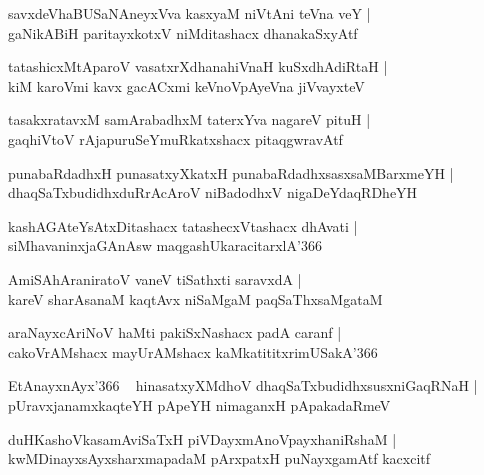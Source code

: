 \documentclass[twoside,12pt,openright]{book}
\newcounter{shloka}[chapter]
\begin{document}
\begin{shloka}%
savxdeVhaBUSaNAneyxVva kasxyaM niVtAni teVna veY |\\
gaNikABiH paritayxkotxV niMditashacx dhanakaSxyAtf
\end{shloka}

\begin{shloka}%
tatashicxMtAparoV vasatxrXdhanahiVnaH kuSxdhAdiRtaH |\\
kiM karoVmi kavx gacACxmi keVnoVpAyeVna jiVvayxteV
\end{shloka}

\begin{shloka}%
tasakxratavxM samArabadhxM taterxYva nagareV pituH |\\
gaqhiVtoV rAjapuruSeYmuRkatxshacx pitaqgwravAtf
\end{shloka}

\begin{shloka}%
punabaRdadhxH punasatxyXkatxH punabaRdadhxsasxsaMBarxmeYH |\\
dhaqSaTxbudidhxduRrAcAroV niBadodhxV nigaDeYdaqRDheYH
\end{shloka}

\begin{shloka}%
kashAGAteYsAtxDitashacx tatashecxVtashacx dhAvati |\\
siMhavaninxjaGAnAsw maqgashUkaracitarxlA\char'366
\end{shloka}

\begin{shloka}%
AmiSAhAraniratoV vaneV tiSathxti saravxdA |\\
kareV sharAsanaM kaqtAvx niSaMgaM paqSaThxsaMgataM 
\end{shloka}

\begin{shloka}%
araNayxcAriNoV haMti pakiSxNashacx padA caranf |\\
cakoVrAMshacx mayUrAMshacx kaMkatititxrimUSakA\char'366
\end{shloka}

\begin{shloka}%
EtAnayxnAyx\char'366 ~ hinasatxyXMdhoV dhaqSaTxbudidhxsusxniGaqRNaH |\\
pUravxjanamxkaqteYH pApeYH nimaganxH pApakadaRmeV
\end{shloka}

\begin{shloka}%
duHKashoVkasamAviSaTxH piVDayxmAnoVpayxhaniRshaM |\\
kwMDinayxsAyxsharxmapadaM pArxpatxH puNayxgamAtf kacxcitf
\end{shloka}
\end{document}
